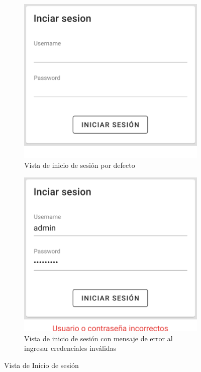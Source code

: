 \begin{figure}[ht]
    \centering
    \begin{subfigure}[b]{0.45\textwidth}
        \centering
        \includegraphics[width=\textwidth]{images/app/login.png}
        \caption{Vista de inicio de sesión por defecto \newline}
        \label{fig:app-login_default}
    \end{subfigure}
    \hfill
    \begin{subfigure}[b]{0.45\textwidth}
        \centering
        \includegraphics[width=\textwidth]{images/app/login-error.png}
        \caption{Vista de inicio de sesión con mensaje de error al ingresar credenciales inválidas}
        \label{fig:app-login_error}
    \end{subfigure}
    \caption{Vista de Inicio de sesión}
    \label{fig:app-login}
\end{figure}


